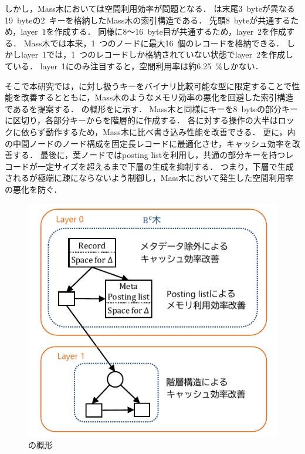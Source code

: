 しかし，Mass木においては空間利用効率が問題となる．
\Fig{\ref{fig:memory}}は末尾3~byteが異なる19~byteの2~キーを格納したMass木の索引構造である．
先頭8~byteが共通するため，layer~1を作成する．
同様に8～16~byte目が共通するため，layer~2を作成する．
Mass木では本来，1~つのノードに最大16~個のレコードを格納できる．
しかしlayer~1では，1~つのレコードしか格納されていない状態でlayer~2を作成している．
layer~1にのみ注目すると，空間利用率は約6.25~\%しかない．

そこで本研究では，\Bctree{}に対し扱うキーをバイナリ比較可能な型に限定することで性能を改善するとともに，Mass木のようなメモリ効率の悪化を回避した索引構造である\Bcforest{}を提案する．
\Bcforest{}の概形を\Fig{\ref{fig:bcforest}}に示す．
Mass木と同様にキーを8~byteの部分キーに区切り，各部分キーから\Bctree{}を階層的に作成する．
各\Bctree{}に対する操作の大半はロックに依らず動作するため，Mass木に比べ書き込み性能を改善できる．
更に，\Bctree{}内の中間ノードのノード構成を固定長レコードに最適化させ，キャッシュ効率を改善する．
最後に，葉ノードではposting listを利用し，共通の部分キーを持つレコードが一定サイズを超えるまで下層の生成を抑制する．
つまり，下層で生成される\Bctree{}が極端に疎にならないよう制御し，Mass木において発生した空間利用率の悪化を防ぐ．

\begin{figure}[t]
    \centering
    \includegraphics{./figures/bcforest.pdf}
    \caption{\Bcforest{}の概形}
    \label{fig:bcforest}
\end{figure}

